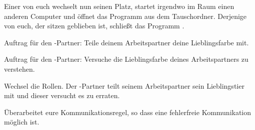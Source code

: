 \documentclass[10pt, a4paper]{scrartcl}
\begin{document}
\begin{aufgabe}
	Einer von euch wechselt nun seinen Platz, startet irgendwo im Raum einen anderen Computer und öffnet das Programm  aus dem Tauschordner. Derjenige von euch, der sitzen geblieben ist, schließt das Programm .
	
	\begin{teilaufgaben}
		\teilaufgabe Auftrag für den -Partner: Teile deinem Arbeitspartner deine Lieblingsfarbe mit.
		
		Auftrag für den -Partner: Versuche die Lieblingsfarbe deines Arbeitspartners zu verstehen.
		
		\teilaufgabe Wechsel die Rollen. Der -Partner teilt seinem Arbeitspartner sein Lieblingstier mit und dieser versucht es zu erraten.
	\end{teilaufgaben}
\end{aufgabe}

\begin{aufgabe}
	Überarbeitet eure Kommunikationsregel, so dass eine fehlerfreie Kommunikation möglich ist.
\end{aufgabe}
\end{document}

